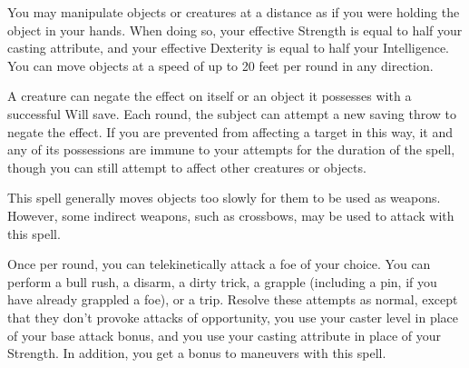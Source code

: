 \spellrng{\rngmed}
\begin{spelleffect}
  You may manipulate objects or creatures at a distance as if you were holding the object in your hands. When doing so, your effective Strength is equal to half your casting attribute, and your effective Dexterity is equal to half your Intelligence. You can move objects at a speed of up to 20 feet per round in any direction.

   A creature can negate the effect on itself or an object it possesses with a successful Will save. Each round, the subject can attempt a new saving throw to negate the effect. If you are prevented from affecting a target in this way, it and any of its possessions are immune to your attempts for the duration of the spell, though you can still attempt to affect other creatures or objects. 
\end{spelleffect}
\begin{spellnotes}
  This spell generally moves objects too slowly for them to be used as weapons. However, some indirect weapons, such as crossbows, may be used to attack with this spell. 
\end{spellnotes}

\spellrng{\rngmed}
\begin{spelleffect}
  Once per round, you can telekinetically attack a foe of your choice. You can perform a bull rush, a disarm, a dirty trick, a grapple (including a pin, if you have already grappled a foe), or a trip. Resolve these attempts as normal, except that they don't provoke attacks of opportunity, you use your caster level in place of your base attack bonus, and you use your casting attribute in place of your Strength. In addition, you get a  bonus to maneuvers with this spell. \bonusscalingdescription
\end{spelleffect}

